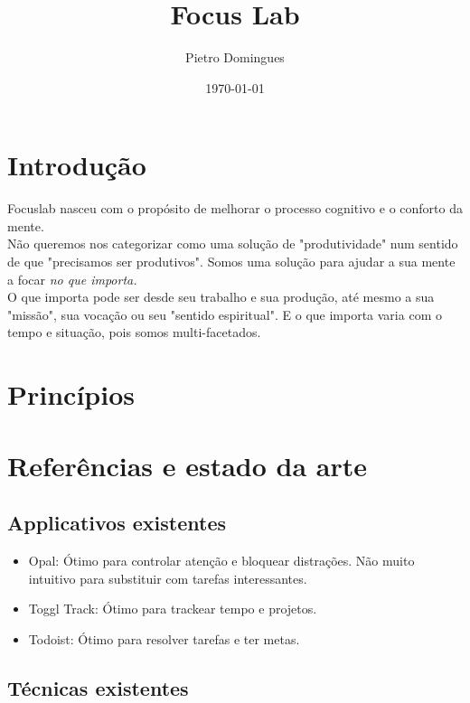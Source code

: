 \documentclass[11pt]{article}
\title{ Focus Lab}
\author{ Pietro Domingues }
\date{\today}
\begin{document}
\maketitle	
\pagebreak





\section{Introdução}

Focuslab nasceu com o propósito de melhorar o processo cognitivo e o conforto da mente.\\

Não queremos nos categorizar como uma solução de "produtividade" num sentido de que "precisamos ser produtivos". Somos uma solução para ajudar a sua mente a focar \textit{no que importa.}\\

O que importa pode ser desde seu trabalho e sua produção, até mesmo a sua "missão", sua vocação ou seu "sentido espiritual". E o que importa varia com o tempo e situação, pois somos multi-facetados.

\section{Princípios}


\section{Referências e estado da arte}

\subsection{Applicativos existentes}

\begin{itemize}
\item Opal: Ótimo para controlar atenção e bloquear distrações. Não muito intuitivo para substituir com tarefas interessantes.
\item Toggl Track: Ótimo para trackear tempo e projetos.
\item Todoist: Ótimo para resolver tarefas e ter metas.
\end{itemize}

\subsection{Técnicas existentes}
\end{document}
